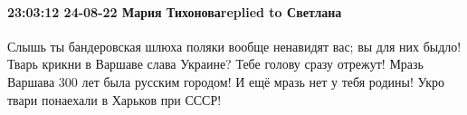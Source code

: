  
 
 
 
 

\paragraph{23:03:12 24-08-22 Мария Тихоноваreplied to Светлана}

Слышь ты бандеровская шлюха поляки вообще ненавидят вас; вы для них быдло!
Тварь крикни в Варшаве слава Украине? Тебе голову сразу отрежут! Мразь Варшава
300 лет была русским городом! И ещё мразь нет у тебя родины! Укро твари
понаехали в Харьков при СССР!
